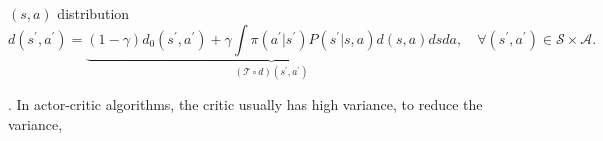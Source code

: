 






$(s, a)$ distribution
\begin{equation}
d(s^\prime, a^\prime) = \underbrace{(1-\gamma) d_{0}(s^\prime, a^\prime) + \gamma \int \pi(a^\prime|s^\prime) P(s^\prime|s, a) d(s, a) ds da}_{(\mathcal{T}\circ d) (s^\prime, a^\prime)}, \quad \forall (s^\prime, a^\prime)\in \mathcal{S}\times\mathcal{A}. 
\end{equation}


. In actor-critic algorithms, the critic usually has high variance, to reduce the variance, 
